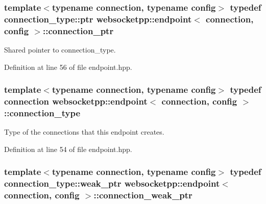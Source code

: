 \subsubsection[{connection\+\_\+ptr}]{\setlength{\rightskip}{0pt plus 5cm}template$<$typename connection, typename config$>$ typedef {\bf connection\+\_\+type\+::ptr} {\bf websocketpp\+::endpoint}$<$ {\bf connection}, config $>$\+::{\bf connection\+\_\+ptr}}\label{classwebsocketpp_1_1endpoint_aa90d289d870c500be228ee1dea75b8b2}


Shared pointer to connection\+\_\+type. 



Definition at line 56 of file endpoint.\+hpp.

\hypertarget{classwebsocketpp_1_1endpoint_a7f5908ada1bc82cb3b519e672bccdaa9}{}
\subsubsection[{connection\+\_\+type}]{\setlength{\rightskip}{0pt plus 5cm}template$<$typename connection, typename config$>$ typedef {\bf connection} {\bf websocketpp\+::endpoint}$<$ {\bf connection}, config $>$\+::{\bf connection\+\_\+type}}\label{classwebsocketpp_1_1endpoint_a7f5908ada1bc82cb3b519e672bccdaa9}


Type of the connections that this endpoint creates. 



Definition at line 54 of file endpoint.\+hpp.

\hypertarget{classwebsocketpp_1_1endpoint_afc1de254d2c4cf68ef29aae7189edb26}{}
\subsubsection[{connection\+\_\+weak\+\_\+ptr}]{\setlength{\rightskip}{0pt plus 5cm}template$<$typename connection, typename config$>$ typedef {\bf connection\+\_\+type\+::weak\+\_\+ptr} {\bf websocketpp\+::endpoint}$<$ {\bf connection}, config $>$\+::{\bf connection\+\_\+weak\+\_\+ptr}}\label{classwebsocketpp_1_1endpoint_afc1de254d2c4cf68ef29aae7189edb26}



